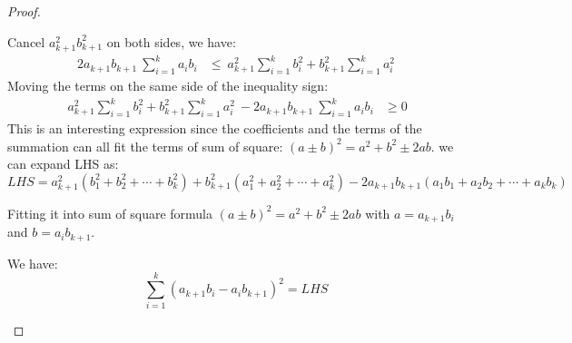 \documentclass[
	12pt, %
	fleqn, %
	a4paper, %
]{LegrandOrangeBook}
\begin{document}
\begin{proof}
\begin{remark}
    \noindent Cancel $a_{k+1}^2b_{k+1}^2$ on both sides, we have:
    \begin{align*}
        2a_{k+1} b_{k+1} \ \sum _{i=1}^{k} a_{i} b_{i} & \leq \ a_{k+1}^{2}\sum _{i=1}^{k} b_{i}^{2} +b_{k+1}^{2}\sum _{i=1}^{k} a_{i}^{2}
    \end{align*}
    Moving the terms on the same side of the inequality sign:
    \begin{align*}
        \ a_{k+1}^{2}\sum _{i=1}^{k} b_{i}^{2} +b_{k+1}^{2}\sum _{i=1}^{k} a_{i}^{2} \ -2a_{k+1} b_{k+1} \ \sum _{i=1}^{k} a_{i} b_{i} & \geq 0
        \end{align*}
    This is an interesting expression since the coefficients and the terms of the summation can all fit the
    terms of sum of square: $(a\pm b)^2 = a^2+b^2\pm 2ab$.
    we can expand LHS as:
    $$
        LHS =a_{k+1}^{2}\left( b_{1}^{2} +b_{2}^{2} +\cdots +b_{k}^{2}\right) +b_{k+1}^{2}\left( a_{1}^{2} +a_{2}^{2} +\cdots +a_{k}^{2}\right) -2a_{k+1} b_{k+1}( a_{1} b_{1} +a_{2} b_{2} +\cdots +a_{k} b_{k})
    $$
    
    Fitting it into sum of square formula $(a\pm b)^2 = a^2+b^2\pm 2ab$ with $a = a_{k+1}b_i$ and $b=a_ib_{k+1}$.
    
    \noindent We have: 
    \[
    \sum_{i=1}^{k} (a_{k+1}b_i - a_ib_{k+1})^2 = LHS
    \]
\end{remark}


\end{proof}
\end{document}
